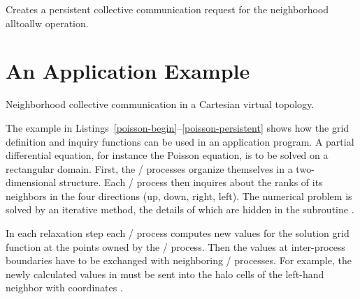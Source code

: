 Creates a persistent collective communication request for the neighborhood alltoallw operation. 



\section{An Application Example}
\label{sec:topol-applic-example}

\begin{example}
\label{topol-exF}
%
%
%
%
%
Neighborhood collective communication in a Cartesian virtual topology.

The example in 
Listings~\ref{poisson-begin}--\ref{poisson-persistent}
shows how the grid definition and
inquiry functions can be used in an application program. A partial
differential equation, for instance the Poisson equation, is to be
solved on a rectangular domain.
First, the \MPI/ processes organize themselves in a two-dimensional
structure. Each \MPI/ process then inquires about the ranks of its
neighbors in the four directions (up, down, right, left).
The numerical problem is solved by an iterative method, the details
of which are hidden in the subroutine .

In each relaxation step each \MPI/ process computes new values for the solution grid
function at the points 
owned by the \MPI/ process. Then the values at inter-process
boundaries have to be exchanged with neighboring \MPI/ processes.
For example, the
newly calculated values in 
must be sent into the halo cells 
of the left-hand neighbor with coordinates .


\end{example}
